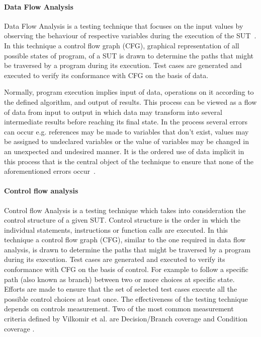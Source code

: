 \paragraph{Data Flow Analysis}
Data Flow Analysis is a testing technique that focuses on the input values by observing the behaviour of respective variables during the execution of the SUT~\cite{clarke1989formal}. In this technique a control flow graph (CFG), graphical representation of all possible states of program, of a SUT is drawn to determine the paths that might be traversed by a program during its execution. Test cases are generated and executed to verify its conformance with CFG on the basis of data. 

Normally, program execution implies input of data, operations on it according to the defined algorithm, and output of results. This process can be viewed as a flow of data from input to output in which data may transform into several intermediate results before reaching its final state. In the process several errors can occur e.g. references may be made to variables that don’t exist, values may be assigned to undeclared variables or the value of variables may be changed in an unexpected and undesired manner. It is the ordered use of data implicit in this process that is the central object of the technique to ensure that none of the aforementioned errors occur~\cite{fosdick1976data}.

\paragraph{Control flow analysis}
Control flow Analysis is a testing technique which takes into consideration the control structure of a given SUT. Control structure is the order in which the individual statements, instructions or function calls are executed. In this technique a control flow graph (CFG), similar to the one required in data flow analysis, is drawn to determine the paths that might be traversed by a program during its execution. Test cases are generated and executed to verify its conformance with CFG on the basis of control. For example to follow a specific path (also known as branch) between two or more choices at specific state. Efforts are made to ensure that the set of selected test cases execute all the possible control choices at least once. The effectiveness of the testing technique depends on controls measurement. Two of the most common measurement criteria defined by Vilkomir et al. are Decision/Branch coverage and Condition coverage \cite{vilkomir2003tolerance}. 


